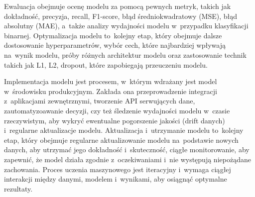 Ewaluacja obejmuje ocenę modelu za pomocą pewnych metryk,
takich jak dokładność, precyzja, recall, F1-score, błąd średniokwadratowy (MSE),
błąd absolutny (MAE), a~także analizy wydajności modelu w~przypadku klasyfikacji binarnej.
Optymalizacja modelu to~kolejny etap, który obejmuje dalsze dostosowanie hyperparametrów,
wybór cech, które najbardziej wpływają na~wynik modelu,
próby różnych architektur modelu oraz zastosowanie technik takich jak L1, L2, dropout,
które zapobiegają przeuczeniu modelu.

Implementacja modelu jest procesem, w~którym wdrażany jest model w~środowisku produkcyjnym.
Zakłada ona przeprowadzenie integracji z~aplikacjami zewnętrznymi, tworzenie API serwujących dane,
zautomatyzoawanie decyzji, czy też śledzenie wydajności modelu w~czasie rzeczywistym,
aby wykryć ewentualne pogorszenie jakości (drift danych) i~regularne aktualizacje modelu.
Aktualizacja i~utrzymanie modelu to~kolejny etap,
który obejmuje regularne aktualizowanie modelu na~podstawie nowych danych,
aby utrzymać jego dokładność i~skuteczność, ciągłe monitorowanie,
aby zapewnić, że model działa zgodnie z~oczekiwaniami i~nie występują niepożądane zachowania.
Proces uczenia maszynowego jest iteracyjny i~wymaga ciągłej interakcji między danymi,
modelem i~wynikami, aby osiągnąć optymalne rezultaty.